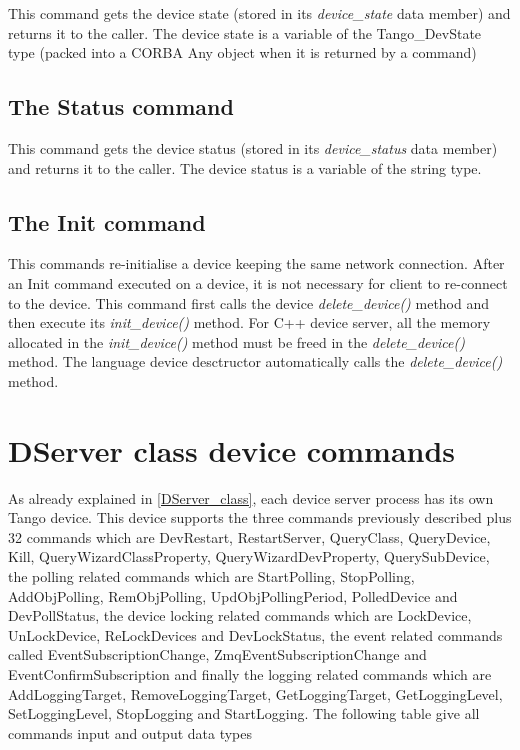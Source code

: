 This command gets the device state (stored in its \emph{device\_state}
data member) and returns it to the caller. The device state is a variable
of the Tango\_DevState type (packed into a CORBA Any object when it
is returned by a command)

\subsection{The Status command}

This command gets the device status (stored in its \emph{device\_status}
data member) and returns it to the caller. The device status is a
variable of the string type.

\subsection{The Init command}

This commands re-initialise a device keeping the same network connection.
After an Init command executed on a device, it is not necessary for
client to re-connect to the device. This command first calls the device
\emph{delete\_device()} method and then execute its \emph{init\_device()}
method. For C++ device server, all the memory allocated in the \emph{init\_device()}
method must be freed in the \emph{delete\_device()} method. The language
device desctructor automatically calls the \emph{delete\_device()}
method.

\section{DServer class device commands}

As already explained in \ref{DServer_class}, each device server process
has its own Tango device. This device supports the three commands
previously described plus 32 commands which are DevRestart,
RestartServer, QueryClass,
QueryDevice, Kill, QueryWizardClassProperty,
QueryWizardDevProperty, QuerySubDevice,
the polling related commands which are StartPolling,
StopPolling, AddObjPolling,
RemObjPolling, UpdObjPollingPeriod,
PolledDevice and DevPollStatus,
the device locking related commands which are LockDevice,
UnLockDevice, ReLockDevices
and DevLockStatus, the event related commands
called EventSubscriptionChange, ZmqEventSubscriptionChange
and EventConfirmSubscription and
finally the logging related commands which are AddLoggingTarget,
RemoveLoggingTarget, GetLoggingTarget,
GetLoggingLevel, SetLoggingLevel,
StopLogging and StartLogging.
The following table give all commands input and output data types

